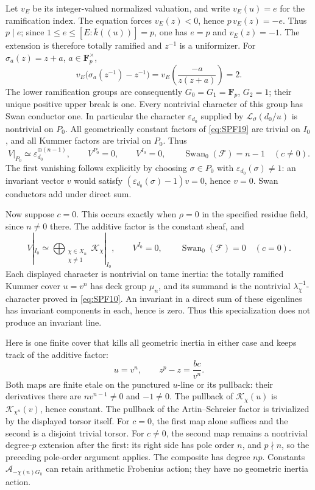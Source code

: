 Let \(v_E\) be its integer-valued normalized valuation, and
write \(v_E(u)=e\) for the ramification index. The equation
forces \(v_E(z)<0\), hence \(p\,v_E(z)=-e\).
Thus \(p\mid e\); since \(1\le e\le [E:\bar k((u))]=p\),
one has \(e=p\) and \(v_E(z)=-1\). The extension is
therefore totally ramified and \(z^{-1}\) is a uniformizer.
For \(\sigma_a(z)=z+a\), \(a\in\mathbf F_p^\times\),
\[
 v_E\bigl(\sigma_a(z^{-1})-z^{-1}\bigr)
  =v_E\left(\frac{-a}{z(z+a)}\right)=2.
 \tag{SPF.23}\label{eq:SPF23}
\]
The lower ramification groups are consequently
\(G_0=G_1=\mathbf F_p\), \(G_2=1\); their unique positive
upper break is one. Every nontrivial character of this group
has Swan conductor one. In particular the character
\(\varepsilon_{d_0}\) supplied by
\(\mathcal L_\vartheta(d_0/u)\) is nontrivial on \(P_0\).
All geometrically constant factors of
\eqref{eq:SPF19} are trivial on \(I_0\), and all Kummer
factors are trivial on \(P_0\). Thus
\[
 V|_{P_0}\simeq \varepsilon_{d_0}^{\oplus(n-1)},\qquad
 V^{P_0}=0,\qquad V^{I_0}=0,\qquad
 \operatorname{Swan}_0(\mathcal F)=n-1
                   \quad(c\ne0).
 \tag{SPF.24}\label{eq:SPF24}
\]
The first vanishing follows explicitly by choosing
\(\sigma\in P_0\) with \(\varepsilon_{d_0}(\sigma)\ne1\):
an invariant vector \(v\) would satisfy
\((\varepsilon_{d_0}(\sigma)-1)v=0\), hence \(v=0\).
Swan conductors add under direct sum.

Now suppose \(c=0\). This occurs exactly when \(\rho=0\)
in the specified residue field, since \(n\ne0\) there.
The additive factor is the constant sheaf, and
\[
 V|_{I_0}\simeq
    \bigoplus_{\substack{\chi\in X_n\\\chi\ne1}}
            \mathcal K_\chi|_{I_0},\qquad
 V^{I_0}=0,\qquad
 \operatorname{Swan}_0(\mathcal F)=0
                      \quad(c=0).
 \tag{SPF.25}\label{eq:SPF25}
\]
Each displayed character is nontrivial on tame inertia:
the totally ramified Kummer cover \(u=v^n\) has deck group
\(\mu_n\), and its summand is the nontrivial
\(\lambda_\chi^{-1}\)-character proved in
\eqref{eq:SPF10}. An invariant in a direct sum of these
eigenlines has invariant components in each, hence is zero.
Thus this specialization does not produce an invariant line.

Here is one finite cover that kills all geometric inertia in
either case and keeps track of the additive factor:
\[
 u=v^n,\qquad z^p-z=\frac{bc}{v^n}.
 \tag{SPF.26}\label{eq:SPF26}
\]
Both maps are finite etale on the punctured \(u\)-line or its
pullback: their derivatives there are \(nv^{n-1}\ne0\) and
\(-1\ne0\). The pullback of \(\mathcal K_\chi(u)\) is
\(\mathcal K_{\chi^n}(v)\), hence constant. The pullback of
the Artin--Schreier factor is trivialized by the displayed
torsor itself. For \(c=0\), the first map alone suffices and
the second is a disjoint trivial torsor. For \(c\ne0\), the
second map remains a nontrivial degree-\(p\) extension
after the first: its right side has pole order \(n\), and
\(p\nmid n\), so the preceding pole-order argument applies.
The composite has degree \(np\). Constants
\(\mathcal A_{-\chi(n)G_k}\) can retain arithmetic
Frobenius action; they have no geometric inertia action.

